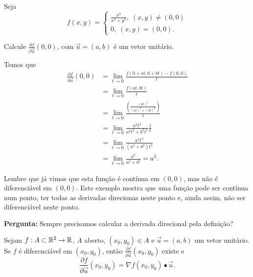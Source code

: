 \begin{example}
    Seja \[f(x,y) = \begin{cases}
        \frac{x^3}{x^2 + y^2},\; (x,y) \neq (0,0) \\
        0,\; (x,y) = (0,0).
    \end{cases}\]

    Calcule \(\frac{\partial f}{\partial \overrightarrow{u}}(0,0)\), com \(\overrightarrow{u} = (a,b)\) é um vetor unitário.

    Temos que
        \begin{align*}
            \frac{\partial f}{\partial \overrightarrow{u}}(0,0)
                & = \lim_{t\to 0} \frac{f(0+at, 0+bt) - f(0,0)}{t}\\
                & = \lim_{t\to 0} \frac{f(at,bt)}{t} \\
                & = \lim_{t\to 0} \frac{\left( \frac{(at)^3}{(at)^2+(bt)^2} \right)}{t} \\
                & = \lim_{t\to 0} \frac{a^3 t^3}{a^2 t^2 + b^2 t^2} \frac{1}{t} \\
                & = \lim_{t\to 0} \frac{a^3 t^3}{(a^2 + b^2)t^3} \\
                & = \lim_{t\to 0} \frac{a^3}{a^2 + b^2} = a^3.
        \end{align*}

    Lembre que já vimos que esta função é contínua em \((0,0)\), mas não é diferenciável em \((0,0)\). Este exemplo mostra que uma função pode ser contínua num ponto, ter todas as derivadas direcionas neste ponto e, ainda assim, não ser diferenciável neste ponto.
\end{example}

\textbf{Pergunta: } Sempre precisamos calcular a derivada direcional pela definição?

\begin{theorem}\label{thm.DerivadaDirecional}
    Sejam \(f: A \subset\mathbb{R}^2 \to \mathbb{R}\), \(A\) aberto, \((x_0,y_0)\in A\) e \(\overrightarrow{u} = (a,b)\) um vetor unitário. Se \(f\) é diferenciável em \((x_0,y_0)\), então \(\frac{\partial f}{\partial\overrightarrow{u}}(x_0,y_0)\) existe e \[\frac{\partial f}{\partial\overrightarrow{u}}(x_0,y_0) = \nabla f(x_0,y_0)\bullet\overrightarrow{u}.\]
\end{theorem}

